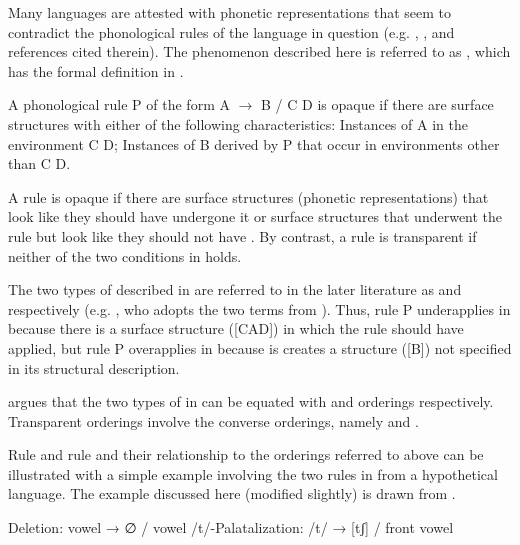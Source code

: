\begin{xlist}
\begin{xlist}
Many languages are attested with phonetic representations that seem to contradict the phonological rules of the language in question (e.g. \citealt{Kiparsky1982a}, \citealt{McCarthy2009}, \citealt{Baković2011} and references cited therein). The phenomenon described here is referred to as , which has the formal definition \citep[79]{Kiparsky1973} in .

\ea%
    \label{ex:2:10}
          A phonological rule P of the form A ${\rightarrow}$ B / C {\longrule} D is opaque if there are surface structures with either of the following characteristics:
\ea\label{ex:2:10a} Instances of A in the environment C {\longrule} D;
\ex\label{ex:2:10b} Instances of B derived by P that occur in environments other than C {\longrule} D.
\z 
\z 

A rule is opaque if there are surface structures (phonetic representations) that look like they should have undergone it  or surface structures that underwent the rule but look like they should not have . By contrast, a rule is transparent if neither of the two conditions in  holds.

The two types of  described in  are referred to in the later literature as  and  respectively (e.g. \citealt{McCarthy2009}, who adopts the two terms from \citealt{Wilbur1974}). Thus, rule P underapplies in  because there is a surface structure ([CAD]) in which the rule should have applied, but rule P overapplies in  because is creates a structure ([B]) not specified in its structural description.

\citet{Kiparsky1973} argues that the two types of  in  can be equated with  and  orderings respectively. Transparent orderings involve the converse orderings, namely  and .

Rule  and rule  and their relationship to the orderings referred to above can be illustrated with a simple example involving the two rules in  from a hypothetical language. The example discussed here (modified slightly) is drawn from \citet{Baković2011}.


\ea%
    \label{ex:2:11}
\ea   Deletion:  vowel → ∅ / {\longrule} vowel
\ex   /t/-Palatalization: /t/ → [tʃ] / front vowel {\longrule}
\z 
\z


\end{xlist}
\end{xlist}
